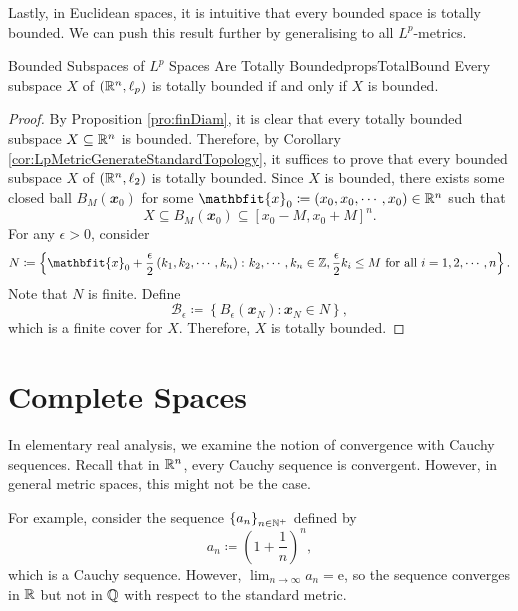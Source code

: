 \documentclass[math]{amznotes}
\theoremstyle{remark}
\newcommand{\e}{\mathrm{e}}
\begin{document}
Lastly, in Euclidean spaces, it is intuitive that every bounded space is totally bounded. We can push this result further by generalising to all $L^p$-metrics.
\begin{probox}{Bounded Subspaces of $L^p$ Spaces Are Totally Bounded}{propsTotalBound}
    Every subspace $X$ of $\left(\mathbb{R}^n, \ell_p\right)$ is totally bounded if and only if $X$ is bounded.
    \tcblower
    \begin{proof}
        By Proposition \ref{pro:finDiam}, it is clear that every totally bounded subspace $X \subseteq \mathbb{R}^n$ is bounded. Therefore, by Corollary \ref{cor:LpMetricGenerateStandardTopology}, it suffices to prove that every bounded subspace $X$ of $\left(\mathbb{R}^n, \ell_{2}\right)$ is totally bounded. Since $X$ is bounded, there exists some closed ball $B_{M}\left(\mathbfit{x}_0\right)$ for some $\mathbfit{x}_0 \coloneqq \left(x_0, x_0, \cdots, x_0\right) \in \R^n$ such that 
        \begin{equation*}
            X \subseteq B_M\left(\mathbfit{x}_0\right) \subseteq \left[x_0 - M, x_0 + M\right]^n.
        \end{equation*}
        For any $\epsilon > 0$, consider 
        \begin{equation*}
            N \coloneqq \left\{\mathbfit{x}_0 + \frac{\epsilon}{2}\left(k_1, k_2, \cdots, k_n\right) \colon k_2, \cdots, k_n \in \Z,  \frac{\epsilon}{2}k_i \leq M \textrm{ for all } i = 1, 2, \cdots, n\right\}.
        \end{equation*}
        Note that $N$ is finite. Define 
        \begin{equation*}
            \mathcal{B}_{\epsilon} \coloneqq \left\{B_{\epsilon}\left(\mathbfit{x}_N\right) \colon \mathbfit{x}_N \in N\right\},
        \end{equation*}
        which is a finite cover for $X$. Therefore, $X$ is totally bounded.
    \end{proof}
\end{probox}
\section{Complete Spaces}
In elementary real analysis, we examine the notion of convergence with Cauchy sequences. Recall that in $\mathbb{R}^n$, every Cauchy sequence is convergent. However, in general metric spaces, this might not be the case. 

For example, consider the sequence $\left\{a_n\right\}_{n \in \mathbb{N}^+}$ defined by 
\begin{equation*}
    a_n \coloneqq \left(1 + \frac{1}{n}\right)^n,
\end{equation*}
which is a Cauchy sequence. However, $\lim_{n \to \infty}a_n = \e$, so the sequence converges in $\mathbb{R}$ but not in $\mathbb{Q}$ with respect to the standard metric. 
\end{document}
